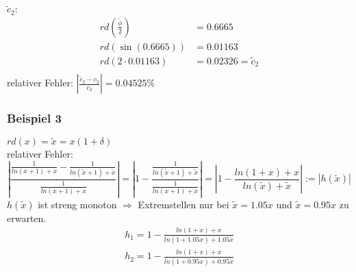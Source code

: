 $ \tilde{c}_2: $ 
\begin{align*}
  rd\left(\frac{\tilde{\phi}}{2}\right) &= 0.6665 \\
  rd(\sin(0.6665)) &= 0.01163 \\
  rd(2 \cdot 0.01163) &= 0.02326 = \tilde{c}_2 \\
\end{align*}
relativer Fehler: $ | \frac{\tilde{c}_2 - c_2}{c_2} | = 0.04525\% $ \\

\subsubsection{Beispiel 3}
$ rd(x) = \tilde{x} = x(1 + \delta) $ \\
relativer Fehler: \\
\begin{equation*}
\left| \frac{\frac{1}{ln(x + 1) + x} - \frac{1}{ln(\tilde{x} + 1) + \tilde{x}} }{\frac{1}{ln(x + 1) + x}} \right| =
\left| 1 - \frac{\frac{1}{ln(\tilde{x} + 1) + \tilde{x}} }{\frac{1}{ln(x + 1) + x}} \right| =
\left| 1 - \frac{ln(1 + x) +x}{ln(\tilde{x}) + \tilde{x}} \right| := | h(\tilde{x}) |
\end{equation*}
$ h(\tilde{x}) $ ist streng monoton $ \Rightarrow $ Extremstellen nur bei 
$ \tilde{x} = 1.05x $ und $ \tilde{x} = 0.95x $ zu erwarten. \\
\begin{equation*}
\begin{split}
  h_1 = 1 - \frac{ln(1 + x) + x}{ln(1 + 1.05x) + 1.05x} \\
  h_2 = 1 - \frac{ln(1 + x) + x}{ln(1 + 0.95x) + 0.95x}
\end{split}
\end{equation*}

